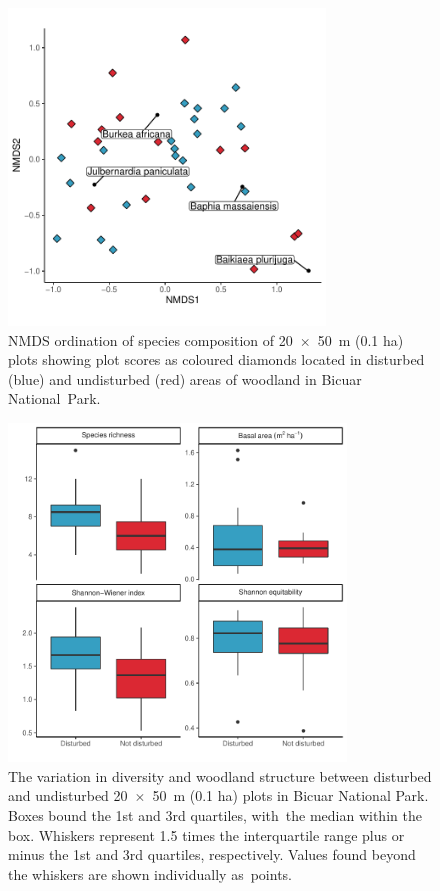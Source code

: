 \documentclass[diversity,article,accept,moreauthors,pdftex]{Definitions/mdpi}
\begin{document}
\begin{figure}[H]
\centering
	\includegraphics[width=0.75\textwidth]{img/bicuar_degrad_nmds}
	\caption{NMDS ordination of species composition of \mbox{20 $\times$ 50 m} (0.1 ha) plots showing plot scores as coloured diamonds located in disturbed (blue) and undisturbed (red) areas of woodland in Bicuar National~Park.}
	\label{bicuar_degrad_nmds}
\end{figure}
\unskip

\begin{figure}[H]
\centering
	\includegraphics[width=0.8\textwidth]{img/degrad_box}
	\caption{The variation in diversity and woodland structure between disturbed and undisturbed \mbox{20 $\times$ 50 m} (0.1 ha) plots in Bicuar National Park. Boxes bound the 1st and 3rd quartiles, with~the median within the box. Whiskers represent 1.5 times the interquartile range plus or minus the 1st and 3rd quartiles, respectively. Values found beyond the whiskers are shown individually as~points.}
	\label{degrad_box}
\end{figure}
\unskip
\end{document}
